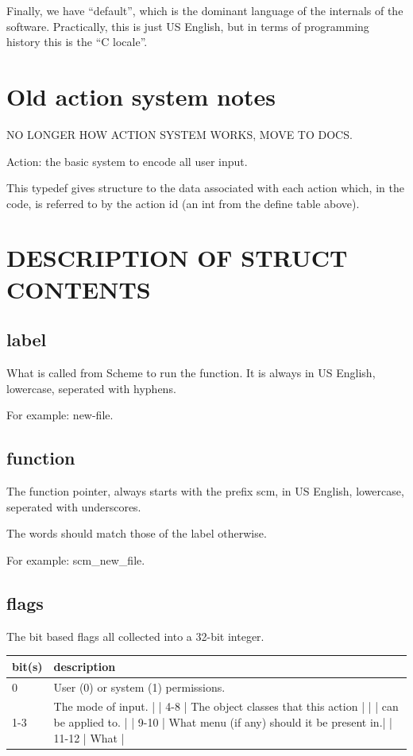 \documentclass{report}
\begin{document}
Finally, we have ``default'', which is the dominant language
of the internals of the software. Practically, this is
just US English, but in terms of programming history this
is the ``C locale''. 

\section{Old action system notes}

NO LONGER HOW ACTION SYSTEM WORKS, MOVE TO DOCS.

Action: the basic system to encode all user input.

This typedef gives structure to the data associated with each action
which, in the code, is referred to by the action id (an int from
the define table above).

\section{DESCRIPTION OF STRUCT CONTENTS}

\subsection{label}

What is called from Scheme to run the function.
It is always in US English, lowercase,
seperated with hyphens.

For example: new-file.

\subsection{function}

The function pointer, always starts with the prefix scm,
in US English, lowercase, seperated with underscores.

The words should match those of the label otherwise.

For example: scm\_new\_file.

\subsection{flags}

The bit based flags all collected into a 32-bit integer.

\begin{tabular}{l l}
bit(s) & description \\
\hline
0 & User (0) or system (1) permissions. \\
1-3 & The mode of input.                         |
| 4-8    | The object classes that this action        |
|        | can be applied to.                         |
| 9-10   | What menu (if any) should it be present in.|
| 11-12  | What                                       |
\end{tabular}
\end{document}
